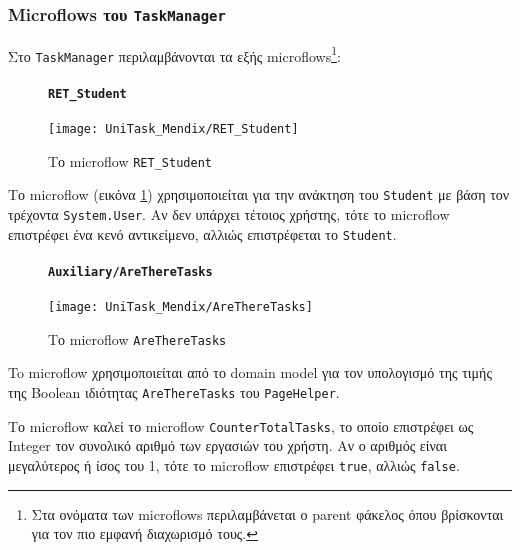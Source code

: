             \subsubsection{Microflows του \texttt{TaskManager}}
                Στο \texttt{TaskManager} περιλαμβάνονται τα εξής microflows\footnote{Στα ονόματα των microflows περιλαμβάνεται ο parent φάκελος όπου βρίσκονται για τον πιο εμφανή διαχωρισμό τους.}:

                \begin{figure}[H] \noindent
                    \paragraph{\texttt{RET\_Student}}
                    \begin{center}
                        \texttt{[image: UniTask\_Mendix/RET\_Student]}
                        \caption{\centering Το microflow \texttt{RET\_Student}}
                        \label{fig:unitask_RET_Student}
                    \end{center}
                \end{figure}

                Το microflow (εικόνα \ref{fig:unitask_RET_Student}) χρησιμοποιείται για την ανάκτηση του \texttt{Student} με βάση τον τρέχοντα \texttt{System.User}. Αν δεν υπάρχει τέτοιος χρήστης, τότε το microflow επιστρέφει ένα κενό αντικείμενο, αλλιώς επιστρέφεται το \texttt{Student}.

                \begin{figure}[H] \noindent
                    \paragraph{\texttt{Auxiliary/AreThereTasks}}
                    \begin{center}
                        \texttt{[image: UniTask\_Mendix/AreThereTasks]}
                        \caption{\centering Το microflow \texttt{AreThereTasks}}
                        \label{fig:unitask_AreThereTasks}
                    \end{center}
                \end{figure}

                To microflow χρησιμοποιείται από το domain model για τον υπολογισμό της τιμής της Boolean ιδιότητας \texttt{AreThereTasks} του \texttt{PageHelper}.

                Το microflow καλεί το microflow \texttt{CounterTotalTasks}, το οποίο επιστρέφει ως Integer τον συνολικό αριθμό των εργασιών του χρήστη. Αν ο αριθμός είναι μεγαλύτερος ή ίσος του 1, τότε το microflow επιστρέφει \texttt{true}, αλλιώς \texttt{false}.

